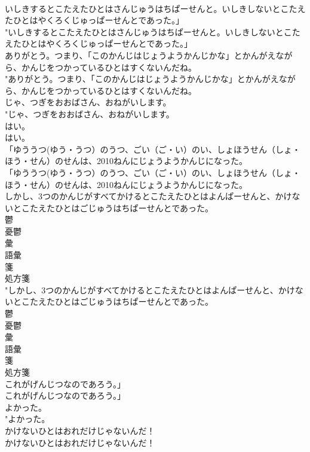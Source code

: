 \documentclass[8pt]{extreport}
\begin{document}
\begin{CJK}{UTF8}{min}
\\	いしきするとこたえたひとはさんじゅうはちぱーせんと。いしきしないとこたえたひとはやくろくじゅっぱーせんとであった。」	
\\	"いしきするとこたえたひとはさんじゅうはちぱーせんと。いしきしないとこたえたひとはやくろくじゅっぱーせんとであった。」 
\\	ありがとう。つまり、「このかんじはじょうようかんじかな」とかんがえながら、かんじをつかっているひとはすくないんだね。	
\\	"ありがとう。つまり、「このかんじはじょうようかんじかな」とかんがえながら、かんじをつかっているひとはすくないんだね。 
\\	じゃ、つぎをおおばさん、おねがいします。	
\\	"じゃ、つぎをおおばさん、おねがいします。 
\\	はい。	
\\	はい。 
\\	「ゆううつ(ゆう・うつ）のうつ、ごい（ご・い）のい、しょほうせん（しょ・ほう・せん）のせんは、2010ねんにじょうようかんじになった。	
\\	「ゆううつ(ゆう・うつ）のうつ、ごい（ご・い）のい、しょほうせん（しょ・ほう・せん）のせんは、2010ねんにじょうようかんじになった。 
\\	しかし、3つのかんじがすべてかけるとこたえたひとはよんぱーせんと、かけないとこたえたひとはごじゅうはちぱーせんとであった。	
\\	鬱 
\\	憂鬱 
\\	彙 
\\	語彙 
\\	箋 
\\	処方箋 
\\	"しかし、3つのかんじがすべてかけるとこたえたひとはよんぱーせんと、かけないとこたえたひとはごじゅうはちぱーせんとであった。 
\\	鬱 
\\	憂鬱 
\\	彙 
\\	語彙 
\\	箋 
\\	処方箋 
\\	これがげんじつなのであろう。」	
\\	これがげんじつなのであろう。」 
\\	よかった。	
\\	"よかった。 
\\	かけないひとはおれだけじゃないんだ！	
\\	かけないひとはおれだけじゃないんだ！ 

\end{CJK}
\end{document}
